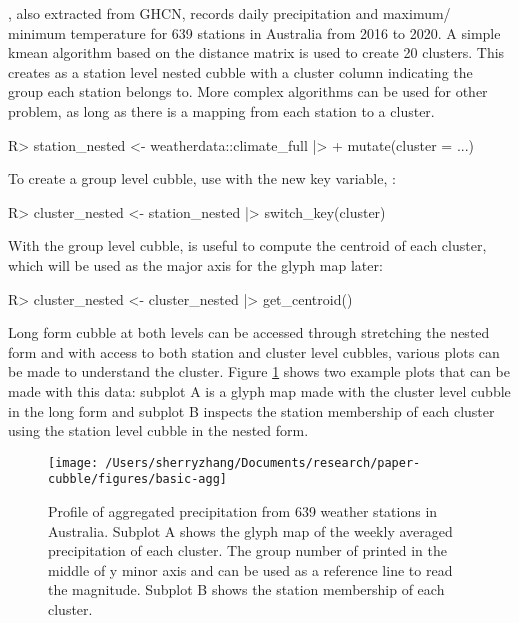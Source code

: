 \documentclass[
]{jss}
\begin{document}
, also extracted from GHCN, records daily precipitation and maximum/ minimum temperature for 639 stations in Australia from 2016 to 2020. A simple kmean algorithm based on the distance matrix is used to create 20 clusters. This creates  as a station level nested cubble with a cluster column indicating the group each station belongs to. More complex algorithms can be used for other problem, as long as there is a mapping from each station to a cluster.

\begin{CodeChunk}
\begin{CodeInput}
R> station_nested <- weatherdata::climate_full |> 
+   mutate(cluster = ...)
\end{CodeInput}
\end{CodeChunk}

To create a group level cubble, use  with the new key variable, :

\begin{CodeChunk}
\begin{CodeInput}
R> cluster_nested <- station_nested |> switch_key(cluster) 
\end{CodeInput}
\end{CodeChunk}

With the group level cubble,  is useful to compute the centroid of each cluster, which will be used as the major axis for the glyph map later:

\begin{CodeChunk}
\begin{CodeInput}
R> cluster_nested <- cluster_nested |> get_centroid()
\end{CodeInput}
\end{CodeChunk}

Long form cubble at both levels can be accessed through stretching the nested form and with access to both station and cluster level cubbles, various plots can be made to understand the cluster. Figure \ref{fig:basic-agg} shows two example plots that can be made with this data: subplot A is a glyph map made with the cluster level cubble in the long form and subplot B inspects the station membership of each cluster using the station level cubble in the nested form.

\begin{CodeChunk}
\begin{figure}

{\centering \texttt{[image: /Users/sherryzhang/Documents/research/paper-cubble/figures/basic-agg]} 

}

\caption[Profile of aggregated precipitation from 639 weather stations in Australia]{Profile of aggregated precipitation from 639 weather stations in Australia. Subplot A shows the glyph map of the weekly averaged precipitation of each cluster. The group number of printed in the middle of y minor axis and can be used as a reference line to read the magnitude. Subplot B shows the station membership of each cluster.}\label{fig:basic-agg}
\end{figure}
\end{CodeChunk}
\end{document}
